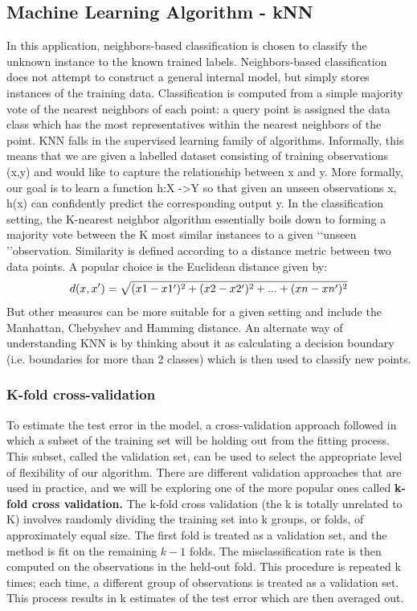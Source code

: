 \documentclass[sigconf]{acmart}
\begin{document}
\subsection{Machine Learning Algorithm - kNN}
\cite{Kevin2016} In this application, neighbors-based classification is chosen to classify the unknown instance to the known trained labels. Neighbors-based classification does not attempt to construct a general internal model, but simply stores instances of the training data. Classification is computed from a simple majority vote of the nearest neighbors of each point: a query point is assigned the data class which has the most representatives within the nearest neighbors of the point.
KNN falls in the supervised learning family of algorithms. Informally, this means that we are given a labelled dataset consisting of training observations (x,y) and would like to capture the relationship between x and y. More formally, our goal is to learn a function h:X ->Y so that given an unseen observations x, h(x) can confidently predict the corresponding output y.
In the classification setting, the K-nearest neighbor algorithm essentially boils down to forming a majority vote between the K most similar instances to a given \lq\lq unseen \rq\rq observation. Similarity is defined according to a distance metric between two data points. A popular choice is the Euclidean distance given by:\newline
\[
d(x,x')=\sqrt{(x1-x1\rq)^2+(x2-x2\rq)^2+...+(xn-xn\rq)^2}
\]\newline
But other measures can be more suitable for a given setting and include the Manhattan, Chebyshev and Hamming distance. 
An alternate way of understanding KNN is by thinking about it as calculating a decision boundary (i.e. boundaries for more than 2 classes) which is then used to classify new points.
\subsubsection{K-fold cross-validation}
To estimate the test error in the model, a cross-validation approach followed in which a subset of the training set will be holding out from the fitting process. This subset, called the validation set, can be used to select the appropriate level of flexibility of our algorithm. There are different validation approaches that are used in practice, and we will be exploring one of the more popular ones called \textbf{k-fold cross validation.}
The k-fold cross validation (the k is totally unrelated to K) involves randomly dividing the training set into k groups, or folds, of approximately equal size. The first fold is treated as a validation set, and the method is fit on the remaining \(k-1\) folds. The misclassification rate is then computed on the observations in the held-out fold. This procedure is repeated k times; each time, a different group of observations is treated as a validation set. This process results in k estimates of the test error which are then averaged out. 
\end{document}
